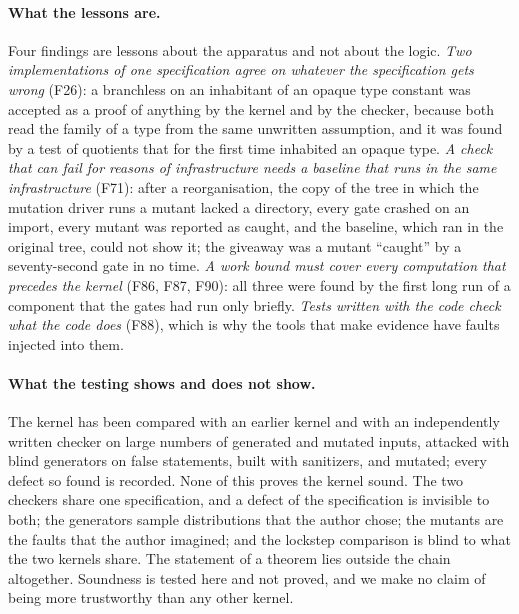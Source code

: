 \paragraph{What the lessons are.}
Four findings are lessons about the apparatus and not about the logic.
\emph{Two implementations of one specification agree on whatever the specification gets wrong} (F26): a branchless  on an inhabitant of an opaque type constant was accepted as a proof of anything by the kernel and by the checker, because both read the family of a type from the same unwritten assumption, and it was found by a test of quotients that for the first time inhabited an opaque type.
\emph{A check that can fail for reasons of infrastructure needs a baseline that runs in the same infrastructure} (F71): after a reorganisation, the copy of the tree in which the mutation driver runs a mutant lacked a directory, every gate crashed on an import, every mutant was reported as caught, and the baseline, which ran in the original tree, could not show it; the giveaway was a mutant ``caught'' by a seventy-second gate in no time.
\emph{A work bound must cover every computation that precedes the kernel} (F86, F87, F90): all three were found by the first long run of a component that the gates had run only briefly.
\emph{Tests written with the code check what the code does} (F88), which is why the tools that make evidence have faults injected into them.

\paragraph{What the testing shows and does not show.}
The kernel has been compared with an earlier kernel and with an independently written checker on large numbers of generated and mutated inputs, attacked with blind generators on false statements, built with sanitizers, and mutated; every defect so found is recorded.
None of this proves the kernel sound.
The two checkers share one specification, and a defect of the specification is invisible to both; the generators sample distributions that the author chose; the mutants are the faults that the author imagined; and the lockstep comparison is blind to what the two kernels share.
The statement of a theorem lies outside the chain altogether.
Soundness is tested here and not proved, and we make no claim of being more trustworthy than any other kernel.
